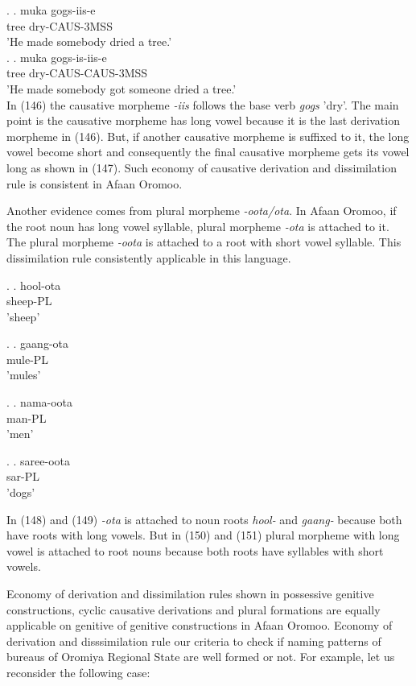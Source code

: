 \documentclass[11pt,a4paper]{article}
\begin{document}
	\ex.
	\ag.
	muka gogs-iis-e\\
	tree dry-CAUS-3MSS\\
	'He made somebody dried a tree.'\\
	
	\ex.
	\ag.
	muka gogs-is-iis-e\\
	tree dry-CAUS-CAUS-3MSS\\
	'He made somebody got someone dried a tree.'\\
	
	In (146) the causative morpheme \emph{-iis} follows the base verb \emph{gogs} 'dry'. The main point is the causative morpheme has long vowel because it is the last derivation morpheme in (146). But, if another causative morpheme is suffixed to it, the long vowel become short and consequently the final causative morpheme gets its vowel long as shown in (147). Such economy of causative derivation and dissimilation rule is consistent in Afaan Oromoo. 
	
	Another evidence comes from plural morpheme \emph{-oota/ota}. In Afaan Oromoo, if the root noun has long vowel syllable, plural morpheme \emph{-ota} is attached to it. The plural morpheme \emph{-oota} is attached to a root with short vowel syllable. This dissimilation rule consistently applicable in this language.
	
	\ex.
	\ag.
	hool-ota\\
	sheep-PL\\
	'sheep'
	
	\ex.
	\ag.
	gaang-ota\\
	mule-PL\\
	'mules'
	
	\ex.
	\ag.
	nama-oota\\
	man-PL\\
	'men'
	
	\ex.
	\ag.
	saree-oota\\
	sar-PL\\
	'dogs'
	
	In (148) and (149) \emph{-ota} is attached to noun roots \emph{hool-} and \emph{gaang-} because both have roots with long vowels. But in (150) and (151) plural morpheme with long vowel is attached to root nouns because both roots have syllables with short vowels. 
	
	Economy of derivation and dissimilation rules shown in possessive genitive constructions, cyclic causative derivations and plural formations are equally applicable on genitive of genitive constructions in Afaan Oromoo. Economy of derivation and disssimilation rule our criteria to check if naming patterns of bureaus of Oromiya Regional State are well formed or not. For example, let us reconsider the following case:
	
\end{document}
